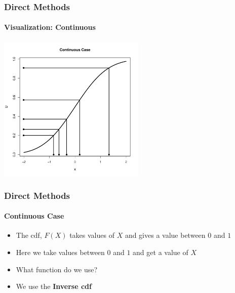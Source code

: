 \documentclass[10pt]{beamer}
\begin{document}
              \begin{frame}
                \frametitle{Direct Methods}
                \framesubtitle{Visualization: Continuous}
                \begin{center}
                  \includegraphics[height=7cm]{./Pics/cp3.pdf}
                \end{center}
              \end{frame}

              \begin{frame}
                \frametitle{Direct Methods}
                \framesubtitle{Continuous Case}
                \begin{itemize}
                \item The cdf, $F(X)$ takes values of $X$ and gives a value between $0$ and $1$

                \item Here we take values between $0$ and $1$ and get a value of $X$

                \item What function do we use?

                \item We use the {\bf Inverse cdf}
                \end{itemize}
              \end{frame}
\end{document}

